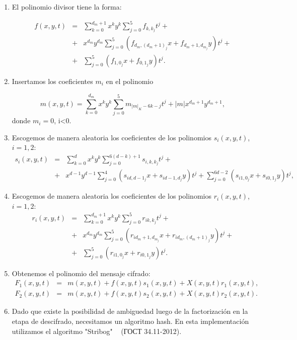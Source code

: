 \documentclass[12pt]{article}
\begin{document}
\begin{enumerate}
\item El polinomio divisor tiene la forma:

\begin{eqnarray*}
f(x,y,t) &=& \sum_{k=0}^{d_m+1}x^k y^k \sum_{j=0}^5 f_{k,k_j}t^j+\\&+& x^{d_m}y^{d_m}\sum_{j=0}^5(f_{d_m,(d_m+1)_j}x+f_{d_m+1,d_{m_j}}y)t^j+\\&+&\sum_{j=0}^5(f_{1,0_j}x+f_{0,1_j}y)t^j.
\end{eqnarray*}

\item Insertamos los coeficientes $m_i$ en el polinomio

$$m(x,y,t)=\sum_{k=0}^{d_m}x^ky^k\sum_{j=0}^5m_{|m|_K-6k-j}t^j+|m|x^{d_m+1}y^{d_m+1},$$
donde $m_i=0$, i<0.
\item Escogemos de manera aleatoria los coeficientes de los polinomios $s_i(x,y,t)$, \\$i = 1,2$:
\begin{eqnarray*}
s_i(x,y,t)&=&\sum_{k=0}^{d} x^k y^k \sum_{j=0}^{6(d-k)+1} s_{i,k,k_j} t^j +\\
&+&x^{d-1} y^{d-1} \sum_{j=0}^{4}(s_{id,d-1_j}x + s_{id-1,d_j}y)t^j + \sum_{j=0}^{6d-2}(s_{i1,0_j}x+s_{i0,1_j}y)t^j,
\end{eqnarray*}
\item Escogemos de manera aleatoria los coeficientes de los polinomios $r_i(x,y,t)$, \\$i = 1,2$:
\begin{eqnarray*}
r_i(x,y,t) &=& \sum_{k=0}^{d_m+1}x^k y^k \sum_{j=0}^5 r_{ik,k_j}t^j+ \\&+&x^{d_m}y^{d_m}\sum_{j=0}^5(r_{id_m+1,d_{m_j}}x+r_{id_m,(d_m+1)_j}y)t^j+\\&+&\sum_{j=0}^5(r_{i1,0_j}x+r_{i0,1_j}y)t^j.
\end{eqnarray*}
\item Obtenemos el polinomio del mensaje cifrado:
\begin{eqnarray*}
F_1(x,y,t)&=& m(x,y,t)+f(x,y,t)s_1(x,y,t)+X(x,y,t)r_1(x,y,t),\\
F_2(x,y,t)&=& m(x,y,t)+f(x,y,t)s_2(x,y,t)+X(x,y,t)r_2(x,y,t).
\end{eqnarray*}
\item Dado que existe la posibilidad de ambiguedad luego de la factorizaci\'on en la etapa de descifrado, necesitamos un algoritmo hash. En esta implementaci\'on utilizamos el algoritmo "Stribog" \hbox{ } (ГОСТ 34.11-2012).

\end{enumerate}
\end{document}
